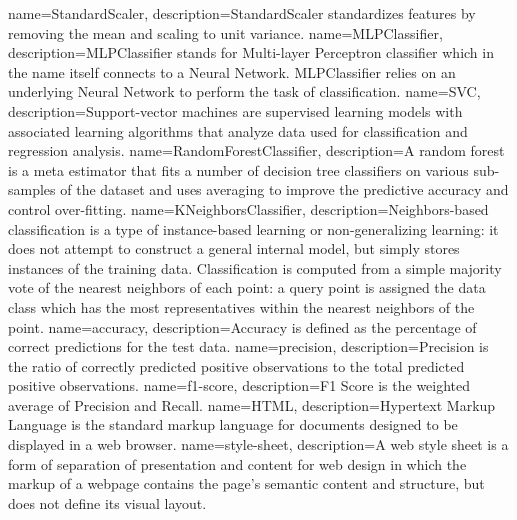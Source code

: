 {
    name={StandardScaler},
    description={StandardScaler standardizes features by removing the mean and scaling to unit variance.}
}
{
    name={MLPClassifier},
    description={MLPClassifier stands for Multi-layer Perceptron classifier which in the name itself connects to a Neural Network. MLPClassifier relies on an underlying Neural Network to perform the task of classification.}
}
{
    name={SVC},
    description={Support-vector machines are supervised learning models with associated learning algorithms that analyze data used for classification and regression analysis.}
}
{
    name={RandomForestClassifier},
    description={A random forest is a meta estimator that fits a number of decision tree classifiers on various sub-samples of the dataset and uses averaging to improve the predictive accuracy and control over-fitting.}
}
{
    name={KNeighborsClassifier},
    description={Neighbors-based classification is a type of instance-based learning or non-generalizing learning: it does not attempt to construct a general internal model, but simply stores instances of the training data. Classification is computed from a simple majority vote of the nearest neighbors of each point: a query point is assigned the data class which has the most representatives within the nearest neighbors of the point.}
}
{
    name={accuracy},
    description={Accuracy is defined as the percentage of correct predictions for the test data.}
}
{
    name={precision},
    description={Precision is the ratio of correctly predicted positive observations to the total predicted positive observations.}
}
{
    name={f1-score},
    description={F1 Score is the weighted average of Precision and Recall.}
}
{
    name={HTML},
    description={Hypertext Markup Language is the standard markup language for documents designed to be displayed in a web browser.}
}
{
    name={style-sheet},
    description={A web style sheet is a form of separation of presentation and content for web design in which the markup of a webpage contains the page's semantic content and structure, but does not define its visual layout.}
}
